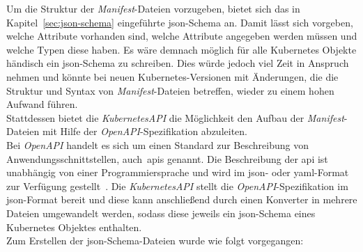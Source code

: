 Um die Struktur der \textit{Manifest}-Dateien vorzugeben, bietet sich das in Kapitel~\ref{sec:json-schema} eingeführte \acs{json}-Schema an.
Damit lässt sich vorgeben, welche Attribute vorhanden sind, welche Attribute angegeben werden müssen und welche Typen diese haben.
Es wäre demnach möglich für alle Kubernetes Objekte händisch ein \acs{json}-Schema zu schreiben. Dies würde jedoch viel Zeit in Anspruch nehmen und
könnte bei neuen Kubernetes-Versionen mit Änderungen, die die Struktur und Syntax von \textit{Manifest}-Dateien betreffen, wieder zu einem hohen Aufwand führen.
\\
Stattdessen bietet die \textit{KubernetesAPI} die Möglichkeit den Aufbau der \textit{Manifest}-Dateien mit Hilfe der \textit{OpenAPI}-Spezifikation abzuleiten.
\\
Bei \textit{OpenAPI} handelt es sich um einen Standard zur Beschreibung von Anwendungsschnittstellen, auch~\ac{apis} genannt. Die Beschreibung der \acs{api} ist
unabhängig von einer Programmiersprache und wird im \ac{json}- oder \ac{yaml}-Format zur Verfügung gestellt~\cite{openapi-org}.
Die \textit{KubernetesAPI} stellt die \textit{OpenAPI}-Spezifikation im \ac{json}-Format bereit und diese kann anschließend durch einen Konverter in
mehrere Dateien umgewandelt werden, sodass diese jeweils ein \acs{json}-Schema eines Kubernetes Objektes enthalten.
\\
Zum Erstellen der \acs{json}-Schema-Dateien wurde wie folgt vorgegangen:

